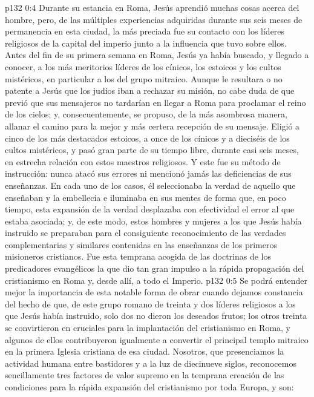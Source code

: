 \vs p132 0:4 Durante su estancia en Roma, Jesús aprendió muchas cosas acerca del hombre, pero, de las múltiples experiencias adquiridas durante sus seis meses de permanencia en esta ciudad, la más preciada fue su contacto con los líderes religiosos de la capital del imperio junto a la influencia que tuvo sobre ellos. Antes del fin de su primera semana en Roma, Jesús ya había buscado, y llegado a conocer, a los más meritorios líderes de los cínicos, los estoicos y los cultos mistéricos, en particular a los del grupo mitraico. Aunque le resultara o no patente a Jesús que los judíos iban a rechazar su misión, no cabe duda de que previó que sus mensajeros no tardarían en llegar a Roma para proclamar el reino de los cielos; y, consecuentemente, se propuso, de la más asombrosa manera, allanar el camino para la mejor y más certera recepción de su mensaje. Eligió a cinco de los más destacados estoicos, a once de los cínicos y a dieciséis de los cultos mistéricos, y pasó gran parte de su tiempo libre, durante casi seis meses, en estrecha relación con estos maestros religiosos. Y este fue su método de instrucción: nunca atacó sus errores ni mencionó jamás las deficiencias de sus enseñanzas. En cada uno de los casos, él seleccionaba la verdad de aquello que enseñaban y la embellecía e iluminaba en sus mentes de forma que, en poco tiempo, esta expansión de la verdad desplazaba con efectividad el error al que estaba asociada; y, de este modo, estos hombres y mujeres a los que Jesús había instruido se preparaban para el consiguiente reconocimiento de las verdades complementarias y similares contenidas en las enseñanzas de los primeros misioneros cristianos. Fue esta temprana acogida de las doctrinas de los predicadores evangélicos la que dio tan gran impulso a la rápida propagación del cristianismo en Roma y, desde allí, a todo el Imperio.
\vs p132 0:5 Se podrá entender mejor la importancia de esta notable forma de obrar cuando dejamos constancia del hecho de que, de este grupo romano de treinta y dos líderes religiosos a los que Jesús había instruido, solo dos no dieron los deseados frutos; los otros treinta se convirtieron en cruciales para la implantación del cristianismo en Roma, y algunos de ellos contribuyeron igualmente a convertir el principal templo mitraico en la primera Iglesia cristiana de esa ciudad. Nosotros, que presenciamos la actividad humana entre bastidores y a la luz de diecinueve siglos, reconocemos sencillamente tres factores de valor supremo en la temprana creación de las condiciones para la rápida expansión del cristianismo por toda Europa, y son:
